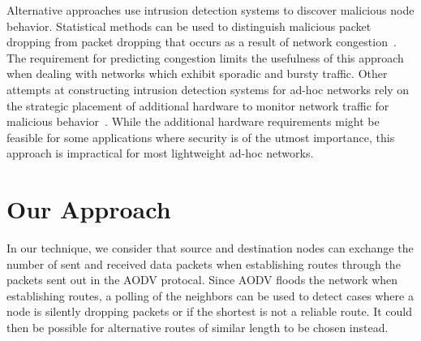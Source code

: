 \documentclass[12pt,a4paper]{report}
\begin{document}
Alternative approaches use intrusion detection systems to discover malicious node behavior. Statistical methods can be used to distinguish malicious packet dropping from packet dropping that occurs as a result of network congestion~\cite{1258776}. The requirement for predicting congestion limits the usefulness of this approach when dealing with networks which exhibit sporadic and bursty traffic. Other attempts at constructing intrusion detection systems for ad-hoc networks rely on the strategic placement of additional hardware to monitor network traffic for malicious behavior~\cite{Tseng:2003:SID:986858.986876}. While the additional hardware requirements might be feasible for some applications where security is of the utmost importance, this approach is impractical for most lightweight ad-hoc networks.

\section{Our Approach}
In our technique, we consider that source and destination nodes can exchange the number of sent and received data packets when establishing routes through the packets sent out in the AODV protocal. Since AODV floods the network when establishing routes, a polling of the neighbors can be used to detect cases where a node is silently dropping packets or if the shortest is not a reliable route.  It could then be possible for alternative routes of similar length to be chosen instead.



\end{document}
